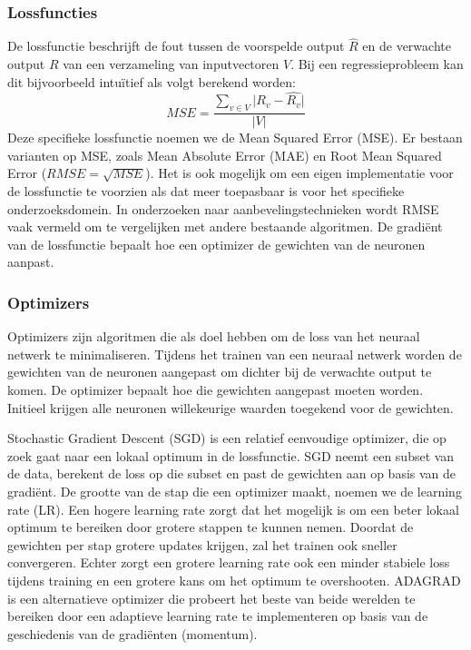 \subsubsection{Lossfuncties}
\label{sec:chapt2_ml_loss_functions}
De lossfunctie beschrijft de fout tussen de voorspelde output $\hat{R}$ en de verwachte output $R$ van een verzameling van inputvectoren $V$. Bij een regressieprobleem kan dit bijvoorbeeld intuïtief als volgt berekend worden:
\begin{equation}
    MSE = \frac{\sum_{v \in V} \lvert R_v - \hat{R_v}\rvert}{\lvert V \rvert}   
    \label{eq:chapt2_mse}
\end{equation}
Deze specifieke lossfunctie noemen we de Mean Squared Error (MSE). Er bestaan varianten op MSE, zoals Mean Absolute Error (MAE) en Root Mean Squared Error ($RMSE = \sqrt{MSE}$). Het is ook mogelijk om een eigen implementatie voor de lossfunctie te voorzien als dat meer toepasbaar is voor het specifieke onderzoeksdomein. In onderzoeken naar aanbevelingstechnieken wordt RMSE vaak vermeld om te vergelijken met andere bestaande algoritmen. \cite{narre, deepconn, wide_deep_learning_paper} De gradiënt van de lossfunctie bepaalt hoe een optimizer de gewichten van de neuronen aanpast.

\subsubsection{Optimizers}
Optimizers zijn algoritmen die als doel hebben om de loss van het neuraal netwerk te minimaliseren. Tijdens het trainen van een neuraal netwerk worden de gewichten van de neuronen aangepast om dichter bij de verwachte output te komen. De optimizer bepaalt hoe die gewichten aangepast moeten worden. Initieel krijgen alle neuronen willekeurige waarden toegekend voor de gewichten.

Stochastic Gradient Descent (SGD) is een relatief eenvoudige optimizer, die op zoek gaat naar een lokaal optimum in de lossfunctie. SGD neemt een subset van de data, berekent de loss op die subset en past de gewichten aan op basis van de gradiënt. \cite{SGD_paper} De grootte van de stap die een optimizer maakt, noemen we de learning rate (LR). Een hogere learning rate zorgt dat het mogelijk is om een beter lokaal optimum te bereiken door grotere stappen te kunnen nemen. Doordat de gewichten per stap grotere updates krijgen, zal het trainen ook sneller convergeren. Echter zorgt een grotere learning rate ook een minder stabiele loss tijdens training en een grotere kans om het optimum te overshooten. \newline
ADAGRAD is een alternatieve optimizer die probeert het beste van beide werelden te bereiken door een adaptieve learning rate te implementeren op basis van de geschiedenis van de gradiënten (momentum). \cite{adagrad_paper}

